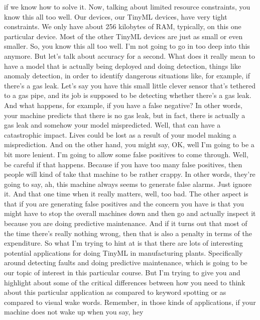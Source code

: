   if we know how to solve it.
  Now, talking about limited resource constraints,
  you know this all too well.
  Our devices, our TinyML devices, have very tight constraints.
  We only have about 256 kilobytes of RAM, typically,
  on this one particular device.
  Most of the other TinyML devices are just as small or even smaller.
  So, you know this all too well.
  I'm not going to go in too deep into this anymore.
  But let's talk about accuracy for a second.
  What does it really mean to have a model that is actually
  being deployed and doing detection, things like anomaly detection,
  in order to identify dangerous situations like,
  for example, if there's a gas leak.
  Let's say you have this small little clever sensor that's
  tethered to a gas pipe, and its job is supposed
  to be detecting whether there's a gas leak.
  And what happens, for example, if you have a false negative?
  In other words, your machine predicts that there is no gas leak,
  but in fact, there is actually a gas leak and somehow
  your model mispredicted.
  Well, that can have a catastrophic impact.
  Lives could be lost as a result of your model making a misprediction.
  And on the other hand, you might say, OK, well I'm
  going to be a bit more lenient.
  I'm going to allow some false positives to come through.
  Well, be careful if that happens.
  Because if you have too many false positives,
  then people will kind of take that machine to be rather crappy.
  In other words, they're going to say, ah,
  this machine always seems to generate false alarms.
  Just ignore it.
  And that one time when it really matters, well, too bad.
  The other aspect is that if you are generating
  false positives and the concern you have is
  that you might have to stop the overall machines down and then go and actually
  inspect it because you are doing predictive maintenance.
  And if it turns out that most of the time there's really nothing wrong,
  then that is also a penalty in terms of the expenditure.
  So what I'm trying to hint at is that there
  are lots of interesting potential applications for doing
  TinyML in manufacturing plants.
  Specifically around detecting faults and doing predictive maintenance,
  which is going to be our topic of interest in this particular course.
  But I'm trying to give you and highlight about some
  of the critical differences between how you
  need to think about this particular application
  as compared to keyword spotting or as compared to visual wake words.
  Remember, in those kinds of applications,
  if your machine does not wake up when you say, hey
